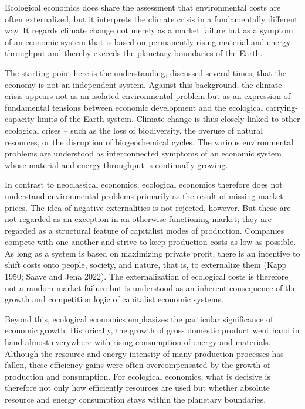 \documentclass[
  british,
  a4paper,
  DIV=11,
  numbers=noendperiod,
  oneside,
  openany]{scrreprt}
\begin{document}
Ecological economics does share the assessment that environmental costs
are often externalized, but it interprets the climate crisis in a
fundamentally different way. It regards climate change not merely as a
market failure but as a symptom of an economic system that is based on
permanently rising material and energy throughput and thereby exceeds
the planetary boundaries of the Earth.

The starting point here is the understanding, discussed several times,
that the economy is not an independent system. Against this background,
the climate crisis appears not as an isolated environmental problem but
as an expression of fundamental tensions between economic development
and the ecological carrying-capacity limits of the Earth system. Climate
change is thus closely linked to other ecological crises -- such as the
loss of biodiversity, the overuse of natural resources, or the
disruption of biogeochemical cycles. The various environmental problems
are understood as interconnected symptoms of an economic system whose
material and energy throughput is continually growing.

In contrast to neoclassical economics, ecological economics therefore
does not understand environmental problems primarily as the result of
missing market prices. The idea of negative externalities is not
rejected, however. But these are not regarded as an exception in an
otherwise functioning market; they are regarded as a structural feature
of capitalist modes of production. Companies compete with one another
and strive to keep production costs as low as possible. As long as a
system is based on maximizing private profit, there is an incentive to
shift costs onto people, society, and nature, that is, to externalize
them (Kapp 1950; Saave and Jena 2022). The externalization of ecological
costs is therefore not a random market failure but is understood as an
inherent consequence of the growth and competition logic of capitalist
economic systems.

Beyond this, ecological economics emphasizes the particular significance
of economic growth. Historically, the growth of gross domestic product
went hand in hand almost everywhere with rising consumption of energy
and materials. Although the resource and energy intensity of many
production processes has fallen, these efficiency gains were often
overcompensated by the growth of production and consumption. For
ecological economics, what is decisive is therefore not only how
efficiently resources are used but whether absolute resource and energy
consumption stays within the planetary boundaries.
\end{document}
